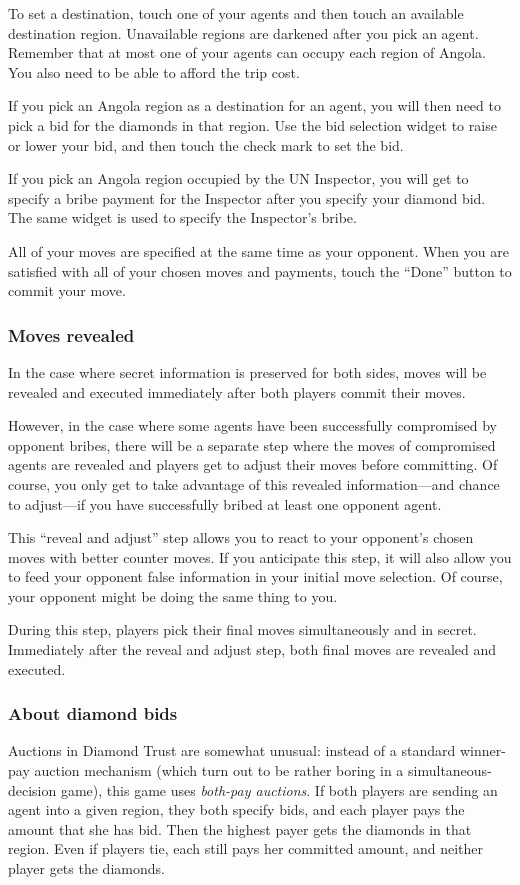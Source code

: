 \documentclass[8pt]{extbook}
\begin{document}
To set a destination, touch one of your agents and then touch an available destination region.  Unavailable regions are darkened after you pick an agent.  Remember that at most one of your agents can occupy each region of Angola.  You also need to be able to afford the trip cost.

If you pick an Angola region as a destination for an agent, you will then need to pick a bid for the diamonds in that region.  Use the bid selection widget to raise or lower your bid, and then touch the check mark to set the bid.

If you pick an Angola region occupied by the UN Inspector, you will get to specify a bribe payment for the Inspector after you specify your diamond bid.  The same widget is used to specify the Inspector's bribe.

All of your moves are specified at the same time as your opponent.  When you are satisfied with all of your chosen moves and payments, touch the ``Done'' button to commit your move.

\subsubsection{Moves revealed}
\label{sec:movesRevealed}
In the case where secret information is preserved for both sides, moves will be revealed and executed immediately after both players commit their moves.

However, in the case where some agents have been successfully compromised by opponent bribes, there will be a separate step where the moves of compromised agents are revealed and players get to adjust their moves before committing.  Of course, you only get to take advantage of this revealed information---and chance to adjust---if you have successfully bribed at least one opponent agent.

This ``reveal and adjust'' step allows you to react to your opponent's chosen moves with better counter moves.  If you anticipate this step, it will also allow you to feed your opponent false information in your initial move selection.  Of course, your opponent might be doing the same thing to you.

During this step, players pick their final moves simultaneously and in secret.  Immediately after the reveal and adjust step, both final moves are revealed and executed.

\subsubsection{About diamond bids}
\label{sec:aboutBids}
Auctions in Diamond Trust are somewhat unusual:  instead of a standard winner-pay auction mechanism (which turn out to be rather boring in a simultaneous-decision game), this game uses {\it both-pay auctions}.  If both players are sending an agent into a given region, they both specify bids, and each player pays the amount that she has bid.  Then the highest payer gets the diamonds in that region.  Even if players tie, each still pays her committed amount, and neither player gets the diamonds.
\end{document}
